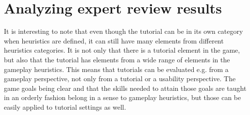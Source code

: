 \chapter{Analyzing expert review results}
It is interesting to note that even though the tutorial can be in its own category when heuristics are defined, it can still have many elements from different heuristics categories. It is not only that there is a tutorial element in the game, but also that the tutorial has elements from a wide range of elements in the gameplay heuristics. This means that tutorials can be evaluated e.g. from a gameplay perspective, not only from a tutorial or a usability perspective. The game goals being clear and that the skills needed to attain those goals are taught in an orderly fashion belong in a sense to gameplay heuristics, but those can be easily applied to tutorial settings as well. 